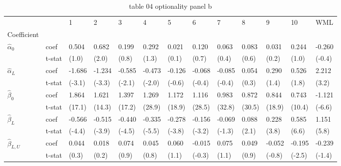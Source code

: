 \begin{table}[htbp]
  \centering
  \caption{table 04 optionality panel b}
  \label{tab:table_04_optionality_panel_b}
  \begin{tabular}{lllllllllllll}
\toprule
 &  & 1 & 2 & 3 & 4 & 5 & 6 & 7 & 8 & 9 & 10 & WML \\
Coefficient &  &  &  &  &  &  &  &  &  &  &  &  \\
\midrule
\multirow[t]{2}{*}{$\hat{\alpha}_0$} & coef & 0.504 & 0.682 & 0.199 & 0.292 & 0.021 & 0.120 & 0.063 & 0.083 & 0.031 & 0.244 & -0.260 \\
 & t-stat & (1.0) & (2.0) & (0.8) & (1.3) & (0.1) & (0.7) & (0.4) & (0.6) & (0.2) & (1.0) & (-0.4) \\
\cline{1-13}
\multirow[t]{2}{*}{$\hat{\alpha}_L$} & coef & -1.686 & -1.234 & -0.585 & -0.473 & -0.126 & -0.068 & -0.085 & 0.054 & 0.290 & 0.526 & 2.212 \\
 & t-stat & (-3.1) & (-3.3) & (-2.1) & (-2.0) & (-0.6) & (-0.4) & (-0.4) & (0.3) & (1.4) & (1.8) & (3.2) \\
\cline{1-13}
\multirow[t]{2}{*}{$\hat{\beta}_0$} & coef & 1.864 & 1.621 & 1.397 & 1.269 & 1.172 & 1.116 & 0.983 & 0.872 & 0.844 & 0.743 & -1.121 \\
 & t-stat & (17.1) & (14.3) & (17.2) & (28.9) & (18.9) & (28.5) & (32.8) & (30.5) & (18.9) & (10.4) & (-6.6) \\
\cline{1-13}
\multirow[t]{2}{*}{$\hat{\beta}_L$} & coef & -0.566 & -0.515 & -0.440 & -0.335 & -0.278 & -0.156 & -0.069 & 0.088 & 0.228 & 0.585 & 1.151 \\
 & t-stat & (-4.4) & (-3.9) & (-4.5) & (-5.5) & (-3.8) & (-3.2) & (-1.3) & (2.1) & (3.8) & (6.6) & (5.8) \\
\cline{1-13}
\multirow[t]{2}{*}{$\hat{\beta}_{L,U}$} & coef & 0.044 & 0.018 & 0.074 & 0.045 & 0.060 & -0.015 & 0.075 & 0.049 & -0.052 & -0.195 & -0.239 \\
 & t-stat & (0.3) & (0.2) & (0.9) & (0.8) & (1.1) & (-0.3) & (1.1) & (0.9) & (-0.8) & (-2.5) & (-1.4) \\
\cline{1-13}
\bottomrule
\end{tabular}
\end{table}
